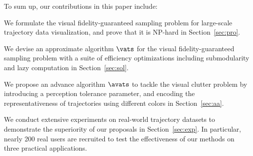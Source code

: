 To sum up, our contributions in this paper include:
\squishlist
  \item We formulate the visual fidelity-guaranteed sampling problem for large-scale trajectory data visualization, and prove that it is {NP-hard} in Section~\ref{sec:pro}.
  \item We devise an approximate algorithm $\vats$ for the visual fidelity-guaranteed sampling problem with a suite of efficiency optimizations including submodularity and lazy computation in Section~\ref{sec:sol}.
  \item We propose an advance algorithm $\avats$ to tackle the visual clutter problem by introducing a perception tolerance parameter, and encoding the representativeness of trajectories using different colors in Section~\ref{sec:aa}.
  \item We conduct extensive experiments on real-world trajectory datasets to demonstrate the superiority of our proposals in Section~\ref{sec:exp}. In particular, nearly 200 real users are recruited to test the effectiveness of our methods on three practical applications.
\squishend




%


